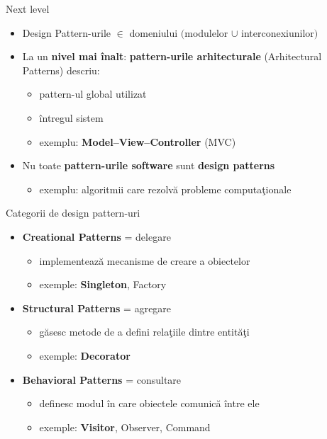 \documentclass{beamer}
\begin{document}
\begin{frame}{Next level}
	\begin{itemize}
	  	\item Design Pattern-urile $\in$ domeniului $($modulelor $\cup$ interconexiunilor$)$
	  	\vspace{4mm}
	  	\item La un \textbf{nivel mai înalt}: \textbf{pattern-urile arhitecturale} (Arhitectural Patterns) descriu:
	  		\begin{itemize}
	  			\item pattern-ul global utilizat
	  			\item întregul sistem
	  			\item exemplu: \textbf{Model–View–Controller} (MVC)
	  		\end{itemize}
	  	\vspace{4mm}
	  	\item Nu toate \textbf{pattern-urile software} sunt \textbf{design patterns}
	  		\begin{itemize}
	  			\item exemplu: algoritmii care rezolvă probleme computaţionale
	  		\end{itemize}
	\end{itemize}
\end{frame}

\begin{frame}{Categorii de design pattern-uri}
	\begin{itemize}
		\item \textbf{Creational Patterns} = delegare
			\begin{itemize}
				\item implementează mecanisme de creare a obiectelor
				\item exemple: \textbf{Singleton}, Factory
			\end{itemize}
		\vspace{4mm}
		\item \textbf{Structural Patterns} = agregare
			\begin{itemize}
				\item găsesc metode de a defini relaţiile dintre entităţi
				\item exemple: \textbf{Decorator}
			\end{itemize}
		\vspace{4mm}
		\item \textbf{Behavioral Patterns} = consultare
			\begin{itemize}
				\item definesc modul în care obiectele comunică între ele
				\item exemple: \textbf{Visitor}, Observer, Command
			\end{itemize}
	\end{itemize}
\end{frame}
\end{document}
